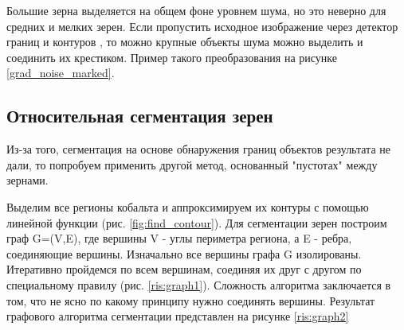 \documentclass[a4paper, 14pt]{article}
\begin{document}
	Большие зерна выделяется на общем фоне уровнем шума, но это неверно для средних и мелких зерен. Если пропустить исходное изображение через детектор границ и контуров \cite{last}, то можно крупные объекты шума можно выделить и соединить их крестиком. Пример такого преобразования  на рисунке \ref{grad_noise_marked}.
	
	
	\subsection{Относительная сегментация зерен}

	Из-за того, сегментация на основе обнаружения границ объектов результата не дали, 
	то попробуем применить другой метод, основанный "пустотах" между зернами.
	
	Выделим все регионы кобальта и аппроксимируем их контуры с помощью линейной функции (рис. \ref{fig:find_contour}).  Для сегментации зерен построим граф G=(V,E), где вершины V - углы периметра региона, а E - ребра, соединяющие вершины.
	Изначально все вершины графа G изолированы. Итеративно пройдемся по всем вершинам, соединяя их друг с другом по специальному правилу (рис. \ref{ris:graph1}).
	Сложность алгоритма заключается в том, что не ясно по какому принципу нужно соединять вершины. Результат графового алгоритма сегментации представлен на рисунке \ref{ris:graph2}
	
\end{document}
